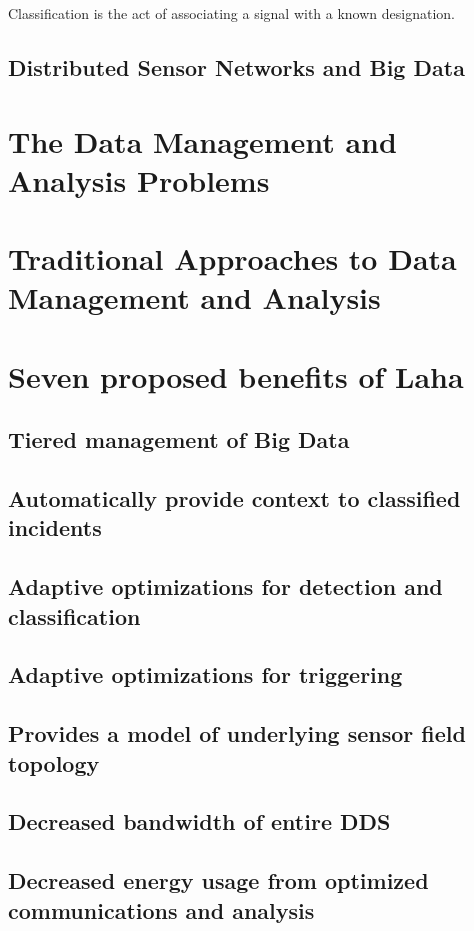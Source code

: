 Classification is the act of associating a signal with a known designation. 

\subsection{Distributed Sensor Networks and Big Data}

\section{The Data Management and Analysis Problems}

\section{Traditional Approaches to Data Management and Analysis}

\section{Seven proposed benefits of Laha} \label{laha-benefits}
\subsection{Tiered management of Big Data}
\subsection{Automatically provide context to classified incidents}
\subsection{Adaptive optimizations for detection and classification}
\subsection{Adaptive optimizations for triggering}
\subsection{Provides a model of underlying sensor field topology}
\subsection{Decreased bandwidth of entire DDS}
\subsection{Decreased energy usage from optimized communications and analysis}

